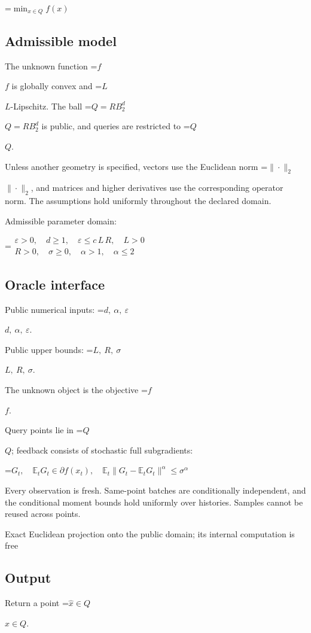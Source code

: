 \documentclass[10pt,a4paper]{article}
\newcommand{\AtlasMath}[1]{\par\begingroup\centering\setbox0=\hbox{$\displaystyle #1$}\ifdim\wd0>1.4\linewidth\typeout{ATLAS WIDE FORMULA: \the\wd0}\fi\ifdim\wd0>\linewidth\resizebox{\linewidth}{!}{\box0}\else\box0\fi\par\endgroup}
\newcommand{\AtlasInlineMath}[1]{\begingroup\setbox0=\hbox{$#1$}\ifdim\wd0>.4\linewidth\endgroup\AtlasMath{#1}\else\endgroup$#1$\fi}
\begin{document}
\AtlasMath{\min_{x\in Q}f(x)}


\subsection{Admissible model}
The unknown function \AtlasInlineMath{f} is globally convex and \AtlasInlineMath{L}-Lipschitz. The ball \AtlasInlineMath{Q=RB_2^d} is public, and queries are restricted to \AtlasInlineMath{Q}.

Unless another geometry is specified, vectors use the Euclidean norm \AtlasInlineMath{\|\cdot\|_2}, and matrices and higher derivatives use the corresponding operator norm. The assumptions hold uniformly throughout the declared domain.

Admissible parameter domain:


\AtlasMath{\begin{gathered}\varepsilon > 0,\quad d \ge 1,\quad \varepsilon \le c\,L\,R,\quad L > 0\\R > 0,\quad \sigma \ge 0,\quad \alpha > 1,\quad \alpha \le 2\end{gathered}}


\subsection{Oracle interface}
Public numerical inputs: \AtlasInlineMath{d,\ \alpha,\ \varepsilon}.

Public upper bounds: \AtlasInlineMath{L,\ R,\ \sigma}.

The unknown object is the objective \AtlasInlineMath{f}.

Query points lie in \AtlasInlineMath{Q}; feedback consists of stochastic full subgradients:


\AtlasMath{G_t,\quad \mathbb{E}_tG_t\in\partial f(x_t),\quad\mathbb{E}_t\|G_t-\mathbb{E}_tG_t\|^\alpha\le\sigma^\alpha}


Every observation is fresh. Same-point batches are conditionally independent, and the conditional moment bounds hold uniformly over histories. Samples cannot be reused across points.

Exact Euclidean projection onto the public domain; its internal computation is free

\subsection{Output}
Return a point \AtlasInlineMath{\widehat x\in Q}.
\end{document}
